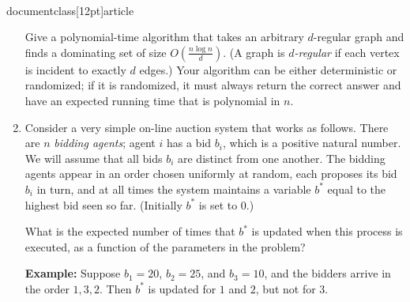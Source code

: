 \\documentclass[12pt]{article}
\begin{document}
\begin{enumerate}
Give a polynomial-time algorithm that takes an arbitrary $d$-regular
graph and finds a dominating set of size $O\left(\frac{n \log n}{d}\right)$.
(A graph is {\em $d$-regular} if
each vertex is incident to exactly $d$ edges.)
Your algorithm can be either deterministic or randomized;
if it is randomized, it must always return the correct answer
and have an expected running time that is polynomial in $n$.


\item 

Consider a very simple on-line auction system that works as follows.
There are $n$ {\em bidding agents}; agent $i$
has a bid $b_i$, which is a positive natural number.
We will assume that all bids $b_i$ are distinct from one another.
The bidding agents appear in an order chosen
uniformly at random, each proposes its bid $b_i$ in turn,
and at all times the system maintains
a variable $b^*$ equal to the highest bid seen so far.
(Initially $b^*$ is set to $0$.)

What is the expected number of times that $b^*$
is updated when this process is executed, as
a function of the parameters in the problem?

{\bf Example:} Suppose $b_1 = 20$, $b_2 = 25$, and $b_3 = 10$,
and the bidders arrive in the order $1, 3, 2$.
Then $b^*$ is updated for $1$ and $2$, but not for $3$.

\end{enumerate}
\end{document}
